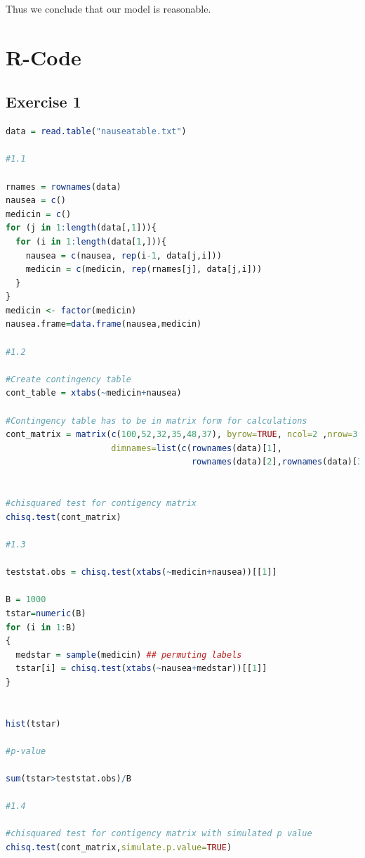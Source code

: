 \documentclass{article}
\begin{document}
    Thus we conclude that our model is reasonable.
    
  \section{R-Code}
    \subsection{Exercise 1}\label{sec:RE1}
      \begin{lstlisting}[language=R]
      data = read.table("nauseatable.txt")

#1.1

rnames = rownames(data)
nausea = c()
medicin = c()
for (j in 1:length(data[,1])){
  for (i in 1:length(data[1,])){
    nausea = c(nausea, rep(i-1, data[j,i]))
    medicin = c(medicin, rep(rnames[j], data[j,i]))
  }
}
medicin <- factor(medicin)
nausea.frame=data.frame(nausea,medicin)

#1.2

#Create contingency table
cont_table = xtabs(~medicin+nausea)

#Contingency table has to be in matrix form for calculations
cont_matrix = matrix(c(100,52,32,35,48,37), byrow=TRUE, ncol=2 ,nrow=3, 
                     dimnames=list(c(rownames(data)[1],
                                     rownames(data)[2],rownames(data)[3]),c("No Nausea","Nausea")))


#chisquared test for contigency matrix
chisq.test(cont_matrix)

#1.3

teststat.obs = chisq.test(xtabs(~medicin+nausea))[[1]]

B = 1000
tstar=numeric(B)
for (i in 1:B)
{
  medstar = sample(medicin) ## permuting labels
  tstar[i] = chisq.test(xtabs(~nausea+medstar))[[1]]
}


hist(tstar)

#p-value

sum(tstar>teststat.obs)/B

#1.4

#chisquared test for contigency matrix with simulated p value
chisq.test(cont_matrix,simulate.p.value=TRUE)
      \end{lstlisting}
\end{document}
